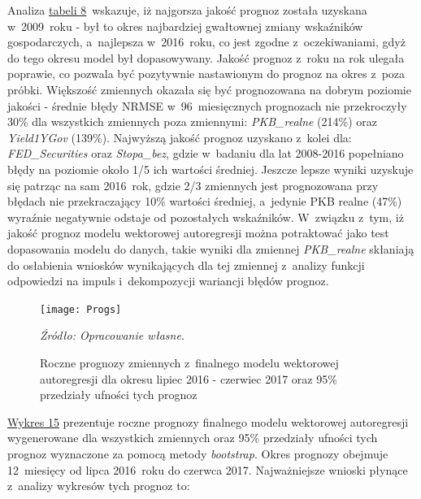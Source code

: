 Analiza \hyperlink{tab7}{tabeli 8}~wskazuje, iż najgorsza jakość prognoz została uzyskana w~2009~roku - był to okres najbardziej gwałtownej zmiany wskaźników gospodarczych, a~najlepsza w~2016~roku, co jest zgodne z~oczekiwaniami, gdyż do tego okresu model był dopasowywany. Jakość prognoz z~roku na rok ulegała poprawie, co pozwala być pozytywnie nastawionym do prognoz na okres z~poza próbki. Większość zmiennych okazała się być prognozowana na dobrym poziomie jakości - średnie błędy \acs{NRMSE} w~96~miesięcznych prognozach nie przekroczyły 30\% dla wszystkich zmiennych poza zmiennymi: \textit{PKB_realne} (214\%) oraz \textit{Yield1YGov} (139\%). Najwyższą jakość prognoz uzyskano z~kolei dla: \textit{FED_Securities} oraz \textit{Stopa_bez}, gdzie w~badaniu dla lat 2008-2016 popełniano błędy na poziomie około 1/5 ich wartości średniej. Jeszcze lepsze wyniki uzyskuje się patrząc na sam 2016~rok, gdzie 2/3 zmiennych jest prognozowana przy błędach nie przekraczający 10\% wartości średniej, a~jedynie \acs{PKB} realne (47\%) wyraźnie negatywnie odstaje od pozostałych wskaźników. W~związku z~tym, iż jakość prognoz modelu wektorowej autoregresji można potraktować jako test dopasowania modelu do danych, takie wyniki dla zmiennej \textit{PKB_realne} skłaniają do osłabienia wniosków wynikających dla tej zmiennej z~analizy funkcji odpowiedzi na impuls i~dekompozycji wariancji błędów prognoz.

\hypertarget{fig16}{}
\begin{figure}[!ht]
\begin{centering}
  \hspace{-0.55cm}\texttt{[image: Progs]}
    \captionsetup{format=hang}
    \caption{Roczne prognozy zmiennych z~finalnego modelu wektorowej autoregresji dla okresu lipiec 2016 - czerwiec 2017 oraz 95\% przedziały ufności tych prognoz}
\end{centering}
\vspace{-0.5cm}
\begin{flushleft}
\hspace{1cm}\textit{\footnotesize{Źródło: Opracowanie własne.}} \\
\end{flushleft}
\vspace{-0.5cm}
\end{figure}

\hyperlink{fig16}{Wykres 15} prezentuje roczne prognozy finalnego modelu wektorowej autoregresji wygenerowane dla wszystkich zmiennych oraz 95\% przedziały ufności tych prognoz wyznaczone za pomocą metody \textit{bootstrap}. Okres prognozy obejmuje 12~miesięcy od lipca 2016~roku do czerwca 2017. Najważniejsze wnioski płynące z~analizy wykresów tych prognoz to:

